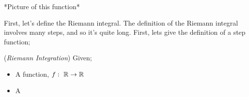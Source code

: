 *Picture of this function*

First, let's define the Riemann integral. The definition of the Riemann integral involves many steps, and so it's quite long.
First, lets give the definition of a step function;
\begin{definition}{{(\em Riemann Integration\/})}
	Given;
	\begin{itemize}
		\item A function, $f: \ \mathbb{R} \rightarrow \mathbb{R}$
		\item A
	\end{itemize}
\end{definition}
	



